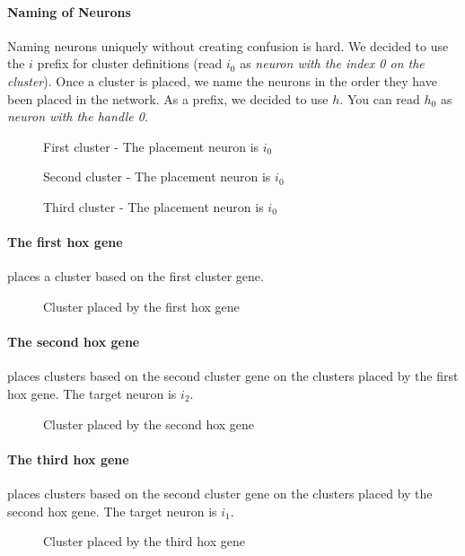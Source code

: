 \paragraph{Naming of Neurons}
Naming neurons uniquely without creating confusion is hard. We decided to use the $i$ prefix for cluster definitions (read $i_0$ as \emph{neuron with the index 0 on the cluster}).
Once a cluster is placed, we name the neurons in the order they have been placed in the network. As a prefix, we decided to use $h$. You can read $h_0$ as \emph{neuron with the handle 0}.

\begin{figure}[H]
    \centering
    
    \caption{First cluster - The placement neuron is $i_0$}
\end{figure}
\begin{figure}[H]
    \centering
    
    \caption{Second cluster - The placement neuron is $i_0$}
\end{figure}
\begin{figure}[H]
    \centering
    
    \caption{Third cluster - The placement neuron is $i_0$}
\end{figure}

\paragraph{The first hox gene} places a cluster based on the first cluster gene.
\FloatBarrier
\begin{figure}[H]
    \centering
    
    \caption{Cluster placed by the first hox gene}
\end{figure}
\FloatBarrier

\newpage

\paragraph{The second hox gene} places clusters based on the second cluster gene on the clusters placed by the first hox gene.
The target neuron is $i_2$.
\begin{figure}[H]
    \centering
    
    \caption{Cluster placed by the second hox gene}
\end{figure}

\paragraph{The third hox gene} places clusters based on the second cluster gene on the clusters placed by the second hox gene.
The target neuron is $i_1$.
\begin{figure}[H]
    \centering
    
    \caption{Cluster placed by the third hox gene}
\end{figure}

